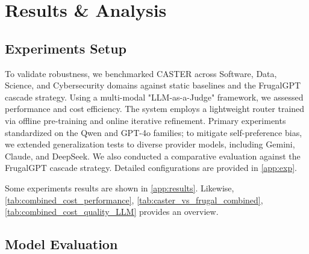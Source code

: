 \documentclass{article}
\theoremstyle{plain}
\theoremstyle{definition}
\theoremstyle{remark}
\begin{document}
\section{Results \& Analysis}

\subsection{Experiments Setup}

To validate robustness, we benchmarked CASTER across Software, Data, Science, and Cybersecurity domains against static baselines and the FrugalGPT cascade strategy. Using a multi-modal "LLM-as-a-Judge" framework, we assessed performance and cost efficiency. The system employs a lightweight router trained via offline pre-training and online iterative refinement. Primary experiments standardized on the Qwen and GPT-4o families; to mitigate self-preference bias\cite{wataoka2024self}, we extended generalization tests to diverse provider models, including Gemini, Claude, and DeepSeek. We also conducted a comparative evaluation against the FrugalGPT cascade strategy. Detailed configurations are provided in \cref{app:exp}.

Some experiments results are shown in \cref{app:results}. Likewise, \cref{tab:combined_cost_performance}, \cref{tab:caster_vs_frugal_combined}, \cref{tab:combined_cost_quality_LLM} provides an overview.

\subsection{Model Evaluation}
\end{document}
